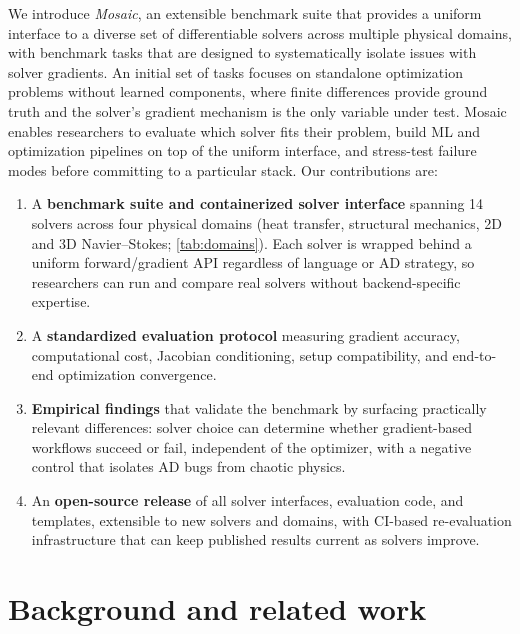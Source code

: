 \documentclass{article}
\begin{document}
We introduce \textit{Mosaic}, an extensible benchmark suite that provides
a uniform interface to a diverse set of differentiable solvers across multiple
physical domains, with benchmark tasks that are designed to systematically isolate
issues with solver gradients. An initial set of tasks focuses on standalone optimization
problems without learned components, where finite differences provide
ground truth and the solver's gradient mechanism is the only variable
under test. Mosaic enables researchers to evaluate which solver fits
their problem, build ML and optimization pipelines on top of the
uniform interface, and stress-test failure modes before
committing to a particular stack. Our contributions are:
%
\begin{enumerate}\itemsep2pt
  \item A \textbf{benchmark suite and containerized solver interface}
    spanning 14 solvers across four physical domains (heat transfer,
    structural mechanics, 2D and 3D Navier--Stokes;
    \cref{tab:domains}). Each solver is wrapped behind a uniform
    forward/gradient API regardless of language or AD strategy, so
    researchers can run and compare real solvers without
    backend-specific expertise.
  \item A \textbf{standardized evaluation protocol} measuring gradient
    accuracy, computational cost, Jacobian conditioning, setup
    compatibility, and end-to-end optimization convergence.
  \item \textbf{Empirical findings} that validate the benchmark by
    surfacing practically relevant differences: solver choice can
    determine whether gradient-based workflows succeed or fail,
    independent of the optimizer,
    with a negative control that isolates AD bugs from chaotic physics.
  \item An \textbf{open-source release} of all solver interfaces, evaluation
    code, and templates, extensible to new solvers and domains, with
    CI-based re-evaluation infrastructure that can keep published results
    current as solvers improve.
\end{enumerate}

\section{Background and related work}
\label{sec:related}
\end{document}
